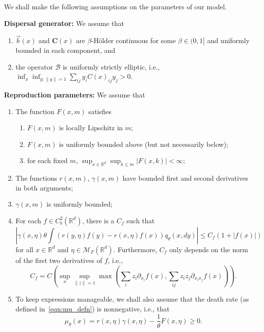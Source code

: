 \documentclass[EJP]{ejpecp} %
\newcommand{\IR}{\mathbb R}
\newcommand{\DG}{\mathcal{B}}  %
\newcommand{\meanq}{\vec b}    %
\newcommand{\covq}{\mathbf{C}}     %
\newcommand{\measures}{\mathcal{M}_F(\IR^d)} %
\begin{document}
\begin{assumptions}%
\label{def:model_setup}
We shall make the following assumptions on the parameters of our model.

{\bf Dispersal generator:}
We assume that
\begin{enumerate}
    \item $\meanq(x)$ and $\covq(x)$ are
        $\beta$-H\"older continuous for some $\beta \in (0, 1]$
        and uniformly bounded
        in each component, and
    \item the operator $\DG$ is uniformly strictly elliptic,
        i.e., $\inf_x \inf_{y:\|y\|=1} \sum_{ij} y_i C(x)_{ij} y_j > 0$.
\end{enumerate}

{\bf Reproduction parameters:}
We assume that 
\begin{enumerate}
            \addtocounter{enumi}{2}
\item The function $F(x,m)$ satisfies 
    \begin{enumerate}
    \item $F(x,m)$ is locally Lipschitz in $m$;
    \item $F(x,m)$ is uniformly bounded above (but not necessarily below);
    \item for each fixed $m$, $\sup_{x\in\IR^d}\sup_{k\leq m}|F(x,k)|<\infty$;
    \end{enumerate}
\item The functions $r(x,m)$, $\gamma(x,m)$ have bounded first and second 
    derivatives in both arguments;
    \label{r_gamma_derivs_condition}
\item $\gamma(x,m)$ is uniformly bounded;
    \label{gamma_bounded_condition}
\item For each $f \in C_b^2(\IR^d)$,
    there is a $C_f$ such that
    $$
        |\gamma(x, \eta) \theta \int 
        (r(y,\eta) f(y) - r(x, \eta) f(x))
        q_\theta(x, dy)| \le C_f (1 + |f(x)|)
    $$
    for all $x \in \IR^d$ and $\eta \in \measures$.
    Furthermore, $C_f$ only depends on the norm of the first two derivatives of $f$,
    i.e., 
    \[
        C_f = C(\sup_x \sup_{\|z\|=1} \max( \sum_i z_i \partial_{x_i} f(x), \sum_{ij} z_i z_j \partial_{x_i x_j} f(x))) .
    \] \label{gamma_B_condition} 
\item To keep expressions manageable, we shall also assume that  
    the death rate (as defined in~\eqref{eqn:mu_defn}) is nonnegative, i.e., that
    \[
    \mu_\theta(x) = r(x,\eta) \gamma(x,\eta) - \frac{1}{\theta} F(x,\eta) \ge 0 .
    \]
\end{enumerate}
\end{assumptions}
\end{document}
